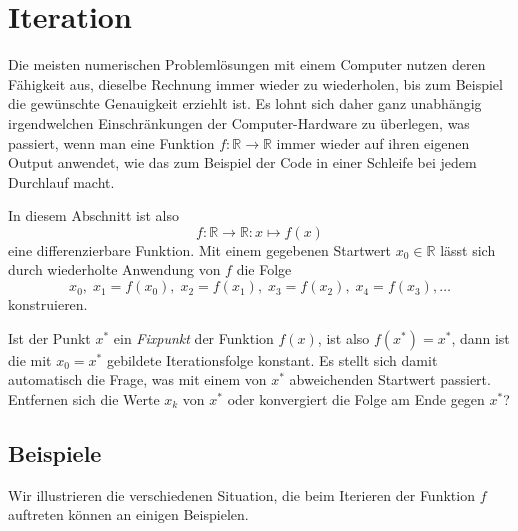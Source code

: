 %
%
%
\section{Iteration
\label{buch:section:iteration}}
Die meisten numerischen Problemlösungen mit einem Computer nutzen deren
Fähigkeit aus, dieselbe Rechnung immer wieder zu wiederholen, bis zum
Beispiel die gewünschte Genauigkeit erziehlt ist.
Es lohnt sich daher ganz unabhängig irgendwelchen Einschränkungen 
der Computer-Hardware zu überlegen, was passiert, wenn man eine
Funktion $f\colon \mathbb R\to\mathbb R$ immer wieder auf ihren eigenen
Output anwendet, wie das zum Beispiel der Code in einer Schleife
bei jedem Durchlauf macht.

In diesem Abschnitt ist also
\[
f\colon \mathbb{R}\to\mathbb{R} : x\mapsto f(x)
\]
eine differenzierbare Funktion.
Mit einem gegebenen Startwert $x_0\in\mathbb R$ lässt sich durch
wiederholte Anwendung von $f$ die Folge
\[
x_0,\; x_1 = f(x_0),\; x_2 = f(x_1),\; x_3 = f(x_2),\; x_4 = f(x_3),\dots
\]
konstruieren.

Ist der Punkt $x^*$ ein {\em Fixpunkt} der Funktion $f(x)$, ist also
$f(x^*)=x^*$,
%
dann ist die mit $x_0=x^*$ gebildete Iterationsfolge konstant.
Es stellt sich damit automatisch die Frage, was mit einem von $x^*$
abweichenden Startwert passiert. Entfernen sich die Werte $x_k$ von $x^*$
oder konvergiert die Folge am Ende gegen $x^*$?

%
%
\subsection{Beispiele}
Wir illustrieren die verschiedenen Situation, die beim Iterieren der
Funktion $f$ auftreten können an einigen Beispielen.

